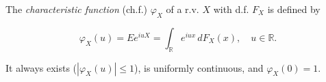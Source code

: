 The \textit{characteristic function} (ch.f.) $\varphi_X$ of a r.v. $X$ with d.f. $F_X$ is defined by

$$\varphi_X(u) = E e^{iuX} = \int_{\mathbb{R}} e^{iux} \, dF_X(x), \quad u \in \mathbb{R}.$$

It always exists ($|\varphi_X(u)| \leq 1$), is uniformly continuous, and $\varphi_X(0) = 1$.
